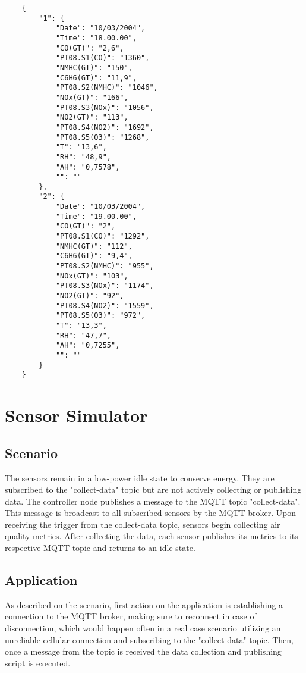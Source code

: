 \begin{verbatim}
    {
        "1": {
            "Date": "10/03/2004",
            "Time": "18.00.00",
            "CO(GT)": "2,6",
            "PT08.S1(CO)": "1360",
            "NMHC(GT)": "150",
            "C6H6(GT)": "11,9",
            "PT08.S2(NMHC)": "1046",
            "NOx(GT)": "166",
            "PT08.S3(NOx)": "1056",
            "NO2(GT)": "113",
            "PT08.S4(NO2)": "1692",
            "PT08.S5(O3)": "1268",
            "T": "13,6",
            "RH": "48,9",
            "AH": "0,7578",
            "": ""
        },
        "2": {
            "Date": "10/03/2004",
            "Time": "19.00.00",
            "CO(GT)": "2",
            "PT08.S1(CO)": "1292",
            "NMHC(GT)": "112",
            "C6H6(GT)": "9,4",
            "PT08.S2(NMHC)": "955",
            "NOx(GT)": "103",
            "PT08.S3(NOx)": "1174",
            "NO2(GT)": "92",
            "PT08.S4(NO2)": "1559",
            "PT08.S5(O3)": "972",
            "T": "13,3",
            "RH": "47,7",
            "AH": "0,7255",
            "": ""
        }
    }
\end{verbatim}

\section{Sensor Simulator}
\subsection{Scenario}
The sensors remain in a low-power idle state to conserve energy. They are subscribed to the "collect-data" topic but are not actively collecting or publishing data. The controller node publishes a message to the MQTT topic "collect-data". This message is broadcast to all subscribed sensors by the MQTT broker. Upon receiving the trigger from the collect-data topic, sensors begin collecting air quality metrics. After collecting the data, each sensor publishes its metrics to its respective MQTT topic and returns to an idle state.
\subsection{Application}
As described on the scenario, first action on the application is establishing a connection to the MQTT broker, making sure to reconnect in case of disconnection, which would happen often in a real case scenario utilizing an unreliable cellular connection and subscribing to the "collect-data" topic. Then, once a message from the topic is received the data collection and publishing script is executed.

